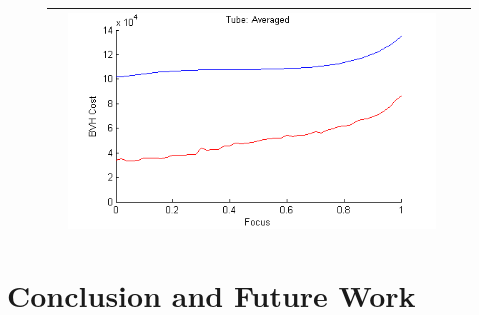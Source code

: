 \documentclass[twocolumn]{article}
\begin{document}
\begin{figure}
\begin{tabular}{|c|c|c|c|}
&\includegraphics[scale=.3]{tube_average.png} \\
\hline
\end{tabular}
\end{figure}

\section{Conclusion and Future Work}
\end{document}
